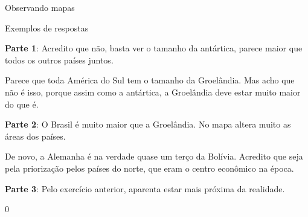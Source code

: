 \begin{answer}{Observando mapas}
{ Exemplos de respostas
  \vspace{.3em}

  \textbf{Parte 1}:
  Acredito que não, basta ver o tamanho da antártica, parece maior que todos os outros países juntos. 

  Parece que toda América do Sul tem o tamanho da Groelândia. Mas acho que não é isso, porque assim como a antártica, a Groelândia deve estar muito maior do que é.
  \vspace{.3em}

  \textbf{Parte 2}:
  O Brasil é muito maior que a Groelândia. No mapa altera muito as áreas dos países.

  De novo, a Alemanha é na verdade quase um terço da Bolívia.  Acredito que seja pela priorização pelos países do norte, que eram o centro econômico na época.

  \vspace{.3em}
  \textbf{Parte 3}:
  Pelo exercício anterior, aparenta estar mais próxima da realidade.
}{0}
\end{answer}
\label{mapamundo1}

